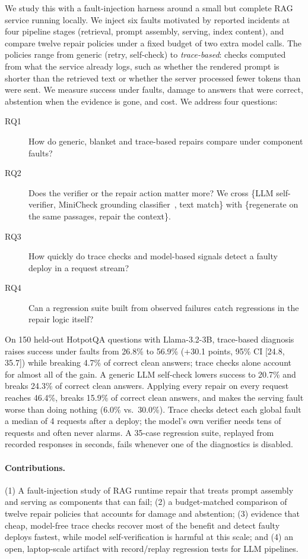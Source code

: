 We study this with a fault-injection harness around a small but complete RAG service running
locally. We inject six faults motivated by reported incidents at four pipeline stages (retrieval,
prompt assembly, serving, index content), and compare twelve repair policies under a fixed budget
of two extra model calls. The policies range from generic (retry, self-check) to
\emph{trace-based}: checks computed from what the service already logs, such as whether the rendered
prompt is shorter than the retrieved text or whether the server processed fewer tokens than were
sent. We measure success under faults, damage to answers that were correct, abstention when the
evidence is gone, and cost. We address four questions:
\begin{description}
\item[RQ1] How do generic, blanket and trace-based repairs compare under component faults?
\item[RQ2] Does the verifier or the repair action matter more? We cross \{LLM self-verifier,
MiniCheck grounding classifier~\cite{tang2024minicheck}, text match\} with \{regenerate on the
same passages, repair the context\}.
\item[RQ3] How quickly do trace checks and model-based signals detect a faulty deploy in a
request stream?
\item[RQ4] Can a regression suite built from observed failures catch regressions in the repair
logic itself?
\end{description}

On 150 held-out HotpotQA questions with Llama-3.2-3B, trace-based diagnosis raises success under
faults from 26.8\% to 56.9\% (+30.1 points, 95\% CI [24.8, 35.7]) while breaking 4.7\% of correct
clean answers; trace checks alone account for almost all of the gain. A generic LLM self-check
lowers success to 20.7\% and breaks 24.3\% of correct clean answers. Applying every repair on every
request reaches 46.4\%, breaks 15.9\% of correct clean answers, and makes the serving fault worse
than doing nothing (6.0\% vs.\ 30.0\%). Trace checks detect each global fault a median of 4
requests after a deploy; the model's own verifier needs tens of requests and often never alarms.
A 35-case regression suite, replayed from recorded responses in seconds, fails whenever one of
the diagnostics is disabled.

\paragraph{Contributions.} (1) A fault-injection study of RAG runtime repair that treats prompt
assembly and serving as components that can fail; (2) a budget-matched comparison of twelve
repair policies that accounts for damage and abstention; (3) evidence that cheap, model-free trace
checks recover most of the benefit and detect faulty deploys fastest, while model self-verification
is harmful at this scale; and (4) an open, laptop-scale artifact with record/replay regression tests
for LLM pipelines.
